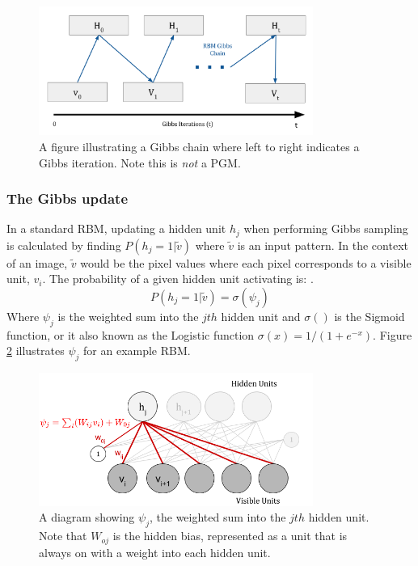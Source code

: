   \begin{figure}[h]
    \begin{center}
      \includegraphics[width=0.8\textwidth]{Assets/RBM-Gibbs-Chain.png}
    \end{center}
    \caption{A figure illustrating a Gibbs chain where left to right indicates a Gibbs iteration. Note this is \emph{not} a PGM.}
    \label{F:Gibbs_Chain}
  \end{figure}

  \subsubsection{The Gibbs update}\label{S:Gibbs-Update}

  In a standard RBM, updating a hidden unit $h_j$ when performing Gibbs sampling is calculated by finding $ P(h_j = 1 | \tilde{v}) $ where $\tilde{v}$ is an input pattern. In the context of an image, $ \tilde{v} $ would be the pixel values where each pixel corresponds to a visible unit, $v_i$.
  The probability of a given hidden unit activating is: .
  \begin{equation}\label{eq:Hid-Gibbs-Update}
  P(h_j = 1 | \tilde{v}) = \sigma(\psi_j)
  \end{equation}
  Where $\psi_j$ is the weighted sum into the $jth$ hidden unit and $\sigma()$ is the Sigmoid function, or it also known as the Logistic function $\sigma(x)=1/(1+e^{-x})$. Figure \ref{F:PSI} illustrates $\psi_j$ for an example RBM.

  \begin{figure}[h]
  \begin{center}
    \includegraphics[width = 0.8\textwidth]{Assets/PSI_and_PHI.png}
  \caption{A diagram showing $\psi_j$, the weighted sum into the $jth$ hidden unit. Note that $W_{oj}$ is the hidden bias, represented as a unit that is always on with a weight into each hidden unit.}
  \label{F:PSI}
  \end{center}
  \end{figure}



